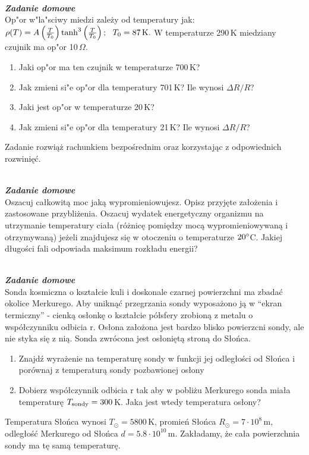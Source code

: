 \documentclass[11pt,a4paper]{article}
\newcounter{zaddom}\newcommand{\zaddom}[1][]{\addtocounter{zaddom}{1} ~\\  {\bf \emph{Zadanie domowe \arabic{zaddom} #1 }} \\}
\begin{document}
\zaddom
Op"or w"la"sciwy miedzi zależy od temperatury jak:
$ \rho(T) = 
  A \left(\frac{T}{T_0}\right) \tanh^3 \left(\frac{T}{T_0}\right);
  ~~ T_0 = 87\,\rm{K}. 
$
W temperaturze 290\,K miedziany czujnik ma op"or 10\,$\Omega$. 
\begin{enumerate}
\item Jaki op"or ma ten czujnik w temperaturze 700\,K? 
\item Jak zmieni si"e op"or dla temperatury 701\,K? Ile wynosi $\Delta R/R$? 
\item Jaki jest op"or w temperaturze 20\,K?
\item Jak zmieni si"e op"or dla temperatury 21\,K? Ile wynosi  $\Delta R/R$?
\end{enumerate}
Zadanie rozwiąż rachunkiem bezpośrednim oraz korzystając z odpowiednich rozwinięć.

\zaddom
Oszacuj całkowitą moc jaką wypromieniowujesz. Opisz przyjęte założenia i zastosowane przybliżenia. Oszacuj
wydatek energetyczny organizmu na utrzymanie temperatury ciała (różnicę pomiędzy mocą wypromieniowywaną
i otrzymywaną) jeżeli znajdujesz się w otoczeniu o temperaturze $20\degree$C.
Jakiej długości fali odpowiada maksimum rozkładu energii?

\zaddom
Sonda kosmiczna o kształcie kuli i doskonale czarnej powierzchni ma zbadać okolice Merkurego. Aby uniknąć
przegrzania sondy wyposażono ją w “ekran termiczny” - cienką osłonkę o kształcie półsfery zrobioną z metalu
o współczynniku odbicia r. Osłona założona jest bardzo blisko powierzcni sondy, ale nie styka się z nią. Sonda
zwrócona jest osłoniętą stroną do Słońca.
\begin{enumerate}
\item Znajdź wyrażenie na temperaturę sondy w funkcji jej odległości od Słońca i porównaj z temperaturą sondy
pozbawionej osłony
\item Dobierz współczynnik odbicia r tak aby w pobliżu Merkurego sonda miała temperaturę $T_{\rm sondy}= 300$\,K. 
Jaka jest wtedy temperatura osłony?
\end{enumerate}
Temperatura Słońca wynosi $T_\odot= 5800$\,K, promień Słońca $R_\odot = 7 \cdot 10^8$\,m, 
odległość Merkurego od Słońca $d = 5.8 \cdot 10^{10}$\,m. 
Zakładamy, że cała powierzchnia sondy ma tę samą temperaturę.
\end{document}
